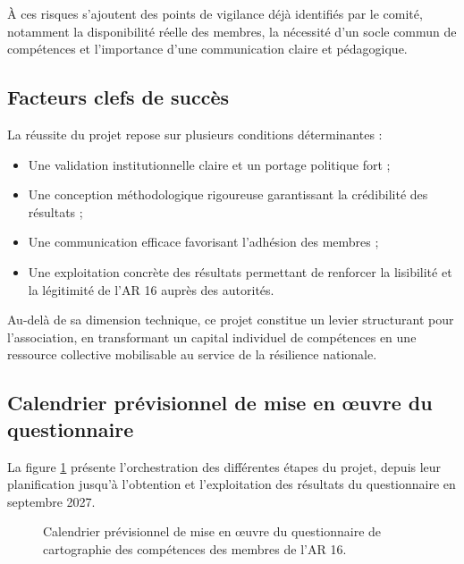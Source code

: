 \documentclass[12pt,a4paper]{article}
\begin{document}
À ces risques s'ajoutent des points de vigilance déjà identifiés par le comité, notamment la disponibilité réelle des membres, la nécessité d'un socle commun de compétences et l'importance d'une communication claire et pédagogique.

\subsection{Facteurs clefs de succès}

La réussite du projet repose sur plusieurs conditions déterminantes :

\begin{itemize}
    \item Une validation institutionnelle claire et un portage politique fort ;
    \item Une conception méthodologique rigoureuse garantissant la crédibilité des résultats ;
    \item Une communication efficace favorisant l'adhésion des membres ;
    \item Une exploitation concrète des résultats permettant de renforcer la lisibilité et la légitimité de l'AR 16 auprès des autorités.
\end{itemize}

Au-delà de sa dimension technique, ce projet constitue un levier structurant pour l'association, en transformant un capital individuel de compétences en une ressource collective mobilisable au service de la résilience nationale.

\clearpage

\subsection{Calendrier prévisionnel de mise en œuvre du questionnaire}

La figure \ref{fig:gantt-questionnaire-ar16} présente l'orchestration des différentes étapes du projet, depuis leur planification jusqu'à l'obtention et l'exploitation des résultats du questionnaire en septembre 2027.

\begin{figure}[H]
\centering

\caption{Calendrier prévisionnel de mise en œuvre du questionnaire de cartographie des compétences des membres de l'AR 16.}
\label{fig:gantt-questionnaire-ar16}
\end{figure}
\end{document}
